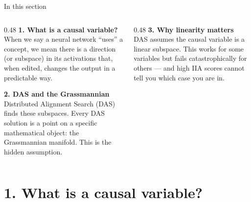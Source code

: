 \documentclass[aspectratio=169,11pt]{beamer}
\begin{document}

\begin{frame}[plain]
\vfill
\begin{center}
  \setlength{\fboxrule}{2.5pt}%
\end{center}
\vfill
\end{frame}

\begin{frame}{In this section}
\begin{columns}[T]
\begin{column}{0.48\textwidth}
\textbf{1. What is a causal variable?}\\[0.2em]
{\small When we say a neural network ``uses'' a concept, we mean there is a direction (or subspace) in its activations that, when edited, changes the output in a predictable way.}

\vspace{0.6em}
\textbf{2. DAS and the Grassmannian}\\[0.2em]
{\small Distributed Alignment Search (DAS) finds these subspaces. Every DAS solution is a point on a specific mathematical object: the Grassmannian manifold. This is the hidden assumption.}
\end{column}
\begin{column}{0.48\textwidth}
\textbf{3. Why linearity matters}\\[0.2em]
{\small DAS assumes the causal variable is a linear subspace. This works for some variables but fails catastrophically for others --- and high IIA scores cannot tell you which case you are in.}
\end{column}
\end{columns}
\end{frame}

\section{1. What is a causal variable?}
\end{document}

